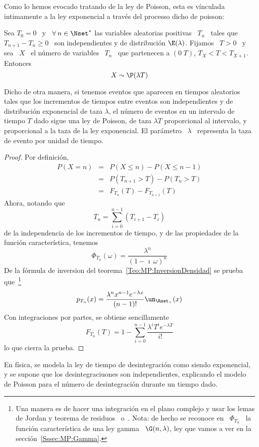 Como  lo hemos  evocado  tratando de  la  ley de  Poisson,  esta es  v\'inculada
intimamente a la ley exponencial a trav\'es del processo dicho de poisson:
%
\begin{lema}
\label{Lem:MP:VinculoExponencialPoisson}
%
  Sea  $T_0 =  0$ \  y \  $\forall \:  n \in  \Nset^*$ las  variables aleatorias
  positivas \ $T_n$ \ tales que $T_{n+1}  - T_n \ge 0$ \ son independientes y de
  distribuci\'on $\E(\lambda)$. Fijamos \ $T > 0$ \ y sea \ $X$ \ el n\'umero de
  variables  \  $T_n$  \  que  partenecen  a   $(0  \;  T)$,  \ie  $T_X  <  T  <
  T_{X+1}$. Entonces
  \[
  X \sim \P(\lambda T)
  \]
\end{lema}
%
Dicho  de otra manera,  si tenemos  eventos que  aparecen en  tiempos aleatorios
tales  que los  incrementos de  tiempos entre  eventos son  independientes  y de
distribuci\'on  exponencial de  taza $\lambda$,  el  n\'umero de  eventos en  un
intervalo  de tiempo $T$  dado sigue  una ley  de Poisson,  de taza  $\lambda T$
proporcional al  intervalo, y proporcional a  la taza de la  ley exponencial. El
par\'ametro \ $\lambda$ \ representa la taza de evento por unidad de tiempo.
%
\begin{proof}
Por definici\'on,
%
\begin{eqnarray*}
P(X = n) & = & P(X\le n) - P(X \le n-1) \\[2mm]
%
& = & P(T_{n+1} > T) - P(T_n > T)\\[2mm]
%
& = & F_{T_n}(T) - F_{T_{n+1}}(T)
\end{eqnarray*}
%
Ahora, notando que
%
\[
T_n = \sum_{i=0}^{n-1} \left( T_{i+1} - T_i \right)
\]
%
de la  independencia de los  incrementos de tiempo,  y de las propiedades  de la
funci\'on caracter\'istica, tenemos
%
\[
\Phi_{T_n}(\omega) = \frac{\lambda^n}{(1-\imath \, \omega)^n}
\]
%
De  la  f\'ormula  de  inversion del  teorema~\ref{Teo:MP:InversionDensidad}  se
prueba  que~\footnote{Una manera  es  de  hacer una  integraci\'on  en el  plano
  complejo  y usar  los lemas  de Jordan  y teorema  de residuos~\cite{CarKro05}
  o~\cite[Cap.~4]{AblFok03}.  Nota: de hecho se  reconoce en \ $\Phi_{T_n}$ \ la
  funci\'on caracter\'istica de una ley gamma \ $\G(n,\lambda)$, ley que vamos a
  ver en la secci\'on~\ref{Sssec:MP:Gamma}.}
%
\[
p_{T_n}(x) = \frac{\lambda^n x^{n-1} e^{-\lambda x}}{(n-1)!} \un_{\Rset_+}(x)
\]
%
Con integraciones por partes, se obtiene sencillamente
%
\[
F_{T_n}(T) = 1 - \sum_{i=0}^{n-1} \frac{\lambda^i T^i e^{-\lambda T}}{i!}
\]
%
lo que cierra la prueba.
\end{proof}
%
En  f\'isica,  se  modela la  ley  de  tiempo  de desintegraci\'on  como  siendo
exponencial,  y   se  supone  que  los   desintegraciuones  son  independientes,
explicando el modelo de Poisson  para el n\'umero de desintegraci\'on durante un
tiempo dado.

